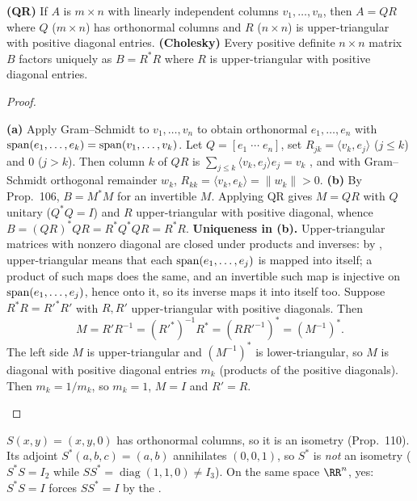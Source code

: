 \documentclass[10pt]{scrartcl}
\begin{document}
\begin{proposition*}
  \begin{enumerate}
    \ii[(a)] \textbf{(QR)} If $A$ is $m\times n$ with linearly independent columns $v_1,\dots,v_n$, then $A=QR$ where $Q$ ($m\times n$) has orthonormal columns and $R$ ($n\times n$) is upper-triangular with positive diagonal entries.
    \ii[(b)] \textbf{(Cholesky)} Every positive definite $n\times n$ matrix $B$ factors uniquely as $B=R^*R$ where $R$ is upper-triangular with positive diagonal entries.
  \end{enumerate}
\end{proposition*}
\begin{proof}
  \begin{steps}
    \ii \textbf{(a)} Apply Gram--Schmidt  to $v_1,\dots,v_n$ to obtain orthonormal $e_1,\dots,e_n$ with $\operatorname{span}(e_1,\dots,e_k)=\operatorname{span}(v_1,\dots,v_k)$. Let $Q=[e_1\;\cdots\;e_n]$, set $R_{jk}=\langle v_k,e_j\rangle$ ($j\le k$) and $0$ ($j>k$). Then column $k$ of $QR$ is $\sum_{j\le k}\langle v_k,e_j\rangle e_j=v_k$ , and with Gram--Schmidt orthogonal remainder $w_k$, $R_{kk}=\langle v_k,e_k\rangle=\|w_k\|>0$.
    \ii \textbf{(b)} By Prop.~106, $B=M^*M$ for an invertible $M$. Applying QR gives $M=QR$ with $Q$ unitary ($Q^*Q=I$) and $R$ upper-triangular with positive diagonal, whence $B=(QR)^*QR=R^*Q^*QR=R^*R$.
    \ii \textbf{Uniqueness in (b).} Upper-triangular matrices with nonzero diagonal are closed under products and inverses: by , upper-triangular means that each $\operatorname{span}(e_1,\dots,e_j)$ is mapped into itself; a product of such maps does the same, and an invertible such map is injective on $\operatorname{span}(e_1,\dots,e_j)$, hence onto it, so its inverse maps it into itself too. Suppose $R^*R=R'^*R'$ with $R,R'$ upper-triangular with positive diagonals. Then
    \[ M=R'R^{-1}=(R'^*)^{-1}R^*=(RR'^{-1})^*=(M^{-1})^*. \]
    The left side $M$ is upper-triangular and $(M^{-1})^*$ is lower-triangular, so $M$ is diagonal with positive diagonal entries $m_k$ (products of the positive diagonals). Then $m_k=1/m_k$, so $m_k=1$, $M=I$ and $R'=R$.
  \end{steps}
\end{proof}

\revisit $S(x,y)=(x,y,0)$ has orthonormal columns, so it is an isometry (Prop.~110). Its adjoint $S^*(a,b,c)=(a,b)$ annihilates $(0,0,1)$, so $S^*$ is \emph{not} an isometry ($S^*S=I_2$ while $SS^*=\operatorname{diag}(1,1,0)\neq I_3$). On the same space $\RR^n$, yes: $S^*S=I$ forces $SS^*=I$ by the .
\end{document}
